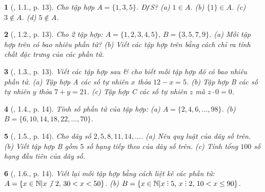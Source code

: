 \documentclass{article}
\newtheorem{baitoan}{}
\DeclareRobustCommand{\divby}{%
	\mathrel{\vbox{\baselineskip.65ex\lineskiplimit0pt\hbox{.}\hbox{.}\hbox{.}}}%
}
\begin{document}
\begin{baitoan}[\cite{Binh_boi_duong_Toan_6_tap_1}, 1.1., p. 13]
	Cho tập hợp $A = \{1,3,5\}$. {\rm Đ{\tt/}S?} (a) $1\in A$. (b) $\{1\}\in A$. (c) $3\notin A$. (d) $5\notin A$.
\end{baitoan}

\begin{baitoan}[\cite{Binh_boi_duong_Toan_6_tap_1}, 1.2., p. 13]
	Cho 2 tập hợp: $A = \{1,2,3,4,5\}$, $B = \{3,5,7,9\}$. (a) Mỗi tập hợp trên có bao nhiêu phần tử? (b) Viết các tập hợp trên bằng cách chỉ ra tính chất đặc trưng của các phần tử.
\end{baitoan}

\begin{baitoan}[\cite{Binh_boi_duong_Toan_6_tap_1}, 1.3., p. 13]
	Viết các tập hợp sau \& cho biết mỗi tập hợp đó có bao nhiêu phần tử. (a) Tập hợp A các số tự nhiên $x$ thỏa $12 - x = 5$. (b) Tập hợp B các số tự nhiên $y$ thỏa $7 + y = 21$. (c) Tập hợp C các số tự nhiên $z$ mà $z\cdot0 = 0$.
\end{baitoan}

\begin{baitoan}[\cite{Binh_boi_duong_Toan_6_tap_1}, 1.4., p. 14]
	Tính số phần tử của tập hợp: (a) $A = \{2,4,6,\ldots,98\}$. (b) $B = \{6,10,14,18,22,\ldots,70\}$.
\end{baitoan}

\begin{baitoan}[\cite{Binh_boi_duong_Toan_6_tap_1}, 1.5., p. 14]
	Cho dãy số $2,5,8,11,14,\ldots$. (a) Nêu quy luật của dãy số trên. (b) Viết tập hợp B gồm $5$ số hạng tiếp theo của dãy số trên. (c) Tính tổng $100$ số hạng đầu tiên của dãy số.
\end{baitoan}

\begin{baitoan}[\cite{Binh_boi_duong_Toan_6_tap_1}, 1.6., p. 14]
	Viết lại mỗi tập hợp bằng cách liệt kê các phần tử: $A = \{x\in\mathbb{N}|{x\not{\divby}\ 2},\,30 < x < 50\}$. (b) $B = \{x\in\mathbb{N}|x\divby5,\,x\divby2,\,10 < x\le90\}$.
\end{baitoan}
\end{document}
